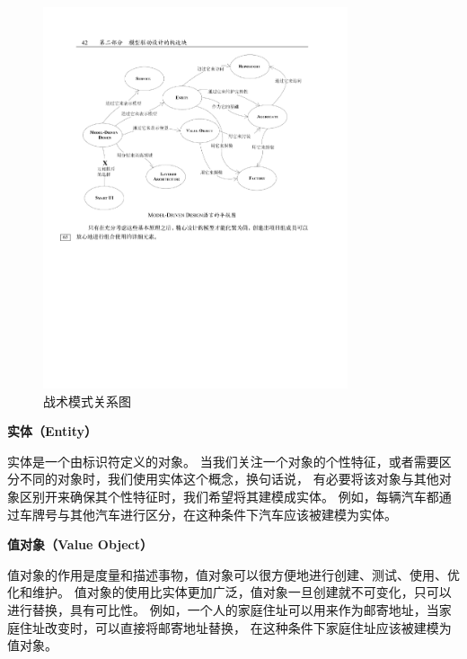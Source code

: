 \begin{figure}[h] %
    \centering %
    \includegraphics[width=0.8\textwidth]{FIGs/chapter2/DDD.pdf} %
    \caption{战术模式关系图\protect\footnotemark[1]} %
    \label{DDD} %
\end{figure}%

\textbf{实体（Entity）}

实体是一个由标识符定义的对象\cite{DBLP:books/daglib/0013521}。
当我们关注一个对象的个性特征，或者需要区分不同的对象时，我们使用实体这个概念，换句话说，
有必要将该对象与其他对象区别开来确保其个性特征时，我们希望将其建模成实体\cite{vernon2013implementing}。
例如，每辆汽车都通过车牌号与其他汽车进行区分，在这种条件下汽车应该被建模为实体。

\textbf{值对象（Value Object）}

值对象的作用是度量和描述事物，值对象可以很方便地进行创建、测试、使用、优化和维护。
值对象的使用比实体更加广泛，值对象一旦创建就不可变化，只可以进行替换，具有可比性\cite{vernon2013implementing}。
例如，一个人的家庭住址可以用来作为邮寄地址，当家庭住址改变时，可以直接将邮寄地址替换，
在这种条件下家庭住址应该被建模为值对象。

